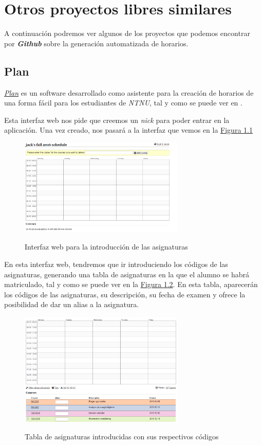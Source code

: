 \chapter{Otros proyectos libres similares}

A continuación podremos ver algunos de los proyectos que podemos encontrar por \textit{\textbf{Github}} sobre la generación automatizada de horarios.

\section{Plan}

\href{https://github.com/adamcik/plan}{\textit{Plan}} es un software desarrollado como asistente para la creación de horarios de una forma fácil para los estudiantes de \textit{NTNU}, tal y como se puede ver en \cite{plan}.

Esta interfaz web nos pide que creemos un \textit{nick} para poder entrar en la aplicación. Una vez creado, nos pasará a la interfaz que vemos en la \hyperref[plan1]{Figura \ref{plan1}}

\begin{figure}[H]
    \centering
    \includegraphics[width=0.7\textwidth]{plan1}
    \label{plan1}
    \caption{Interfaz web para la introducción de las asignaturas}
\end{figure}

En esta interfaz web, tendremos que ir introduciendo los códigos de las asignaturas, generando una tabla de asignaturas en la que el alumno se habrá matriculado, tal y como se puede ver en la \hyperref[plan2]{Figura \ref{plan2}}. En esta tabla, aparecerán los códigos de las asignaturas, su descripción, su fecha de examen y ofrece la posibilidad de dar un alias a la asignatura.

\begin{figure}[H]
    \centering
    \includegraphics[width=0.7\textwidth]{plan2}
    \label{plan2}
    \caption{Tabla de asignaturas introducidas con sus respectivos códigos}
\end{figure}

